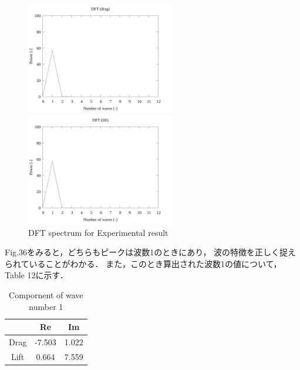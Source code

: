 \begin{figure}
  \begin{minipage}[b]{0.45\linewidth}
    \centering
    \includegraphics[width=65mm]{../../02_workspace/result/2-ex/plot/07/07-3_dft-drag.png}
  \end{minipage}
  \begin{minipage}[b]{0.45\linewidth}
    \centering
    \includegraphics[width=65mm]{../../02_workspace/result/2-ex/plot/07/07-4_dft-lift.png}
  \end{minipage}
  \caption{DFT spectrum for Experimental result}
\end{figure}

Fig.36をみると，どちらもピークは波数1のときにあり，
波の特徴を正しく捉えられていることがわかる．
また，このとき算出された波数1の値について，Table 12に示す．

\begin{table}[htbp]
  \begin{center}
    \caption{Compornent of wave number 1}
    \begin{tabular}{|p{30mm}|p{20mm}|p{20mm}|}
      \hline
      \multicolumn{1}{|c|}{}     & \multicolumn{1}{|c|}{Re}     & \multicolumn{1}{|c|}{Im}    \\ \hline
      \multicolumn{1}{|c|}{Drag} & \multicolumn{1}{|c|}{-7.503} & \multicolumn{1}{|c|}{1.022} \\ \hline
      \multicolumn{1}{|c|}{Lift} & \multicolumn{1}{|c|}{0.664}  & \multicolumn{1}{|c|}{7.559} \\ \hline
    \end{tabular}
  \end{center}
\end{table}


